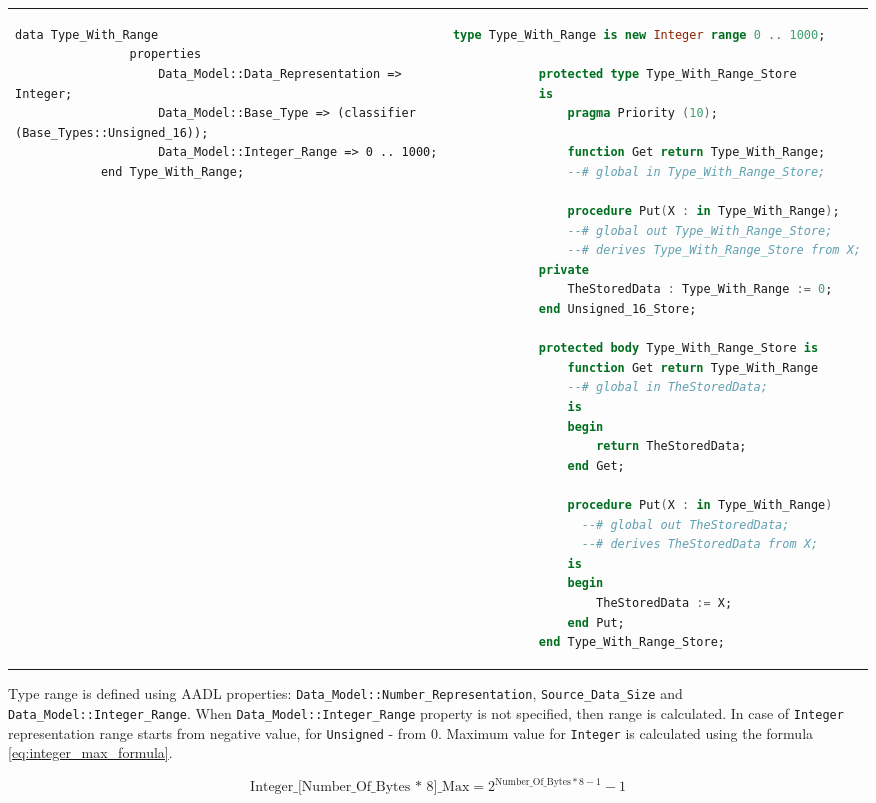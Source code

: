\begin{center}
\begin{longtable}{| p{2in} | p{4in} |}
		\\ \hline

		\begin{lstlisting}[language=aadl]
			data Type_With_Range
				properties
					Data_Model::Data_Representation => Integer;
					Data_Model::Base_Type => (classifier (Base_Types::Unsigned_16));
					Data_Model::Integer_Range => 0 .. 1000;
			end Type_With_Range;
		\end{lstlisting} 
		&
		\begin{lstlisting}[language=ada]
			type Type_With_Range is new Integer range 0 .. 1000;
    
		    protected type Type_With_Range_Store
		    is
		        pragma Priority (10);

		        function Get return Type_With_Range;
		        --# global in Type_With_Range_Store;

		        procedure Put(X : in Type_With_Range);
		        --# global out Type_With_Range_Store;
		        --# derives Type_With_Range_Store from X;
		    private
		        TheStoredData : Type_With_Range := 0;
		    end Unsigned_16_Store;

		    protected body Type_With_Range_Store is
		        function Get return Type_With_Range
		        --# global in TheStoredData;
		        is
		        begin
		            return TheStoredData;
		        end Get;

		        procedure Put(X : in Type_With_Range)
		          --# global out TheStoredData;
		          --# derives TheStoredData from X;
		        is
		        begin
		            TheStoredData := X;
		        end Put;
		    end Type_With_Range_Store;

		\end{lstlisting}
	\end{longtable}
\end{center}
\doublespacing

Type range is defined using AADL properties: \lstinline{Data_Model::Number_Representation}, \lstinline{Source_Data_Size} and \lstinline{Data_Model::Integer_Range}. When \lstinline{Data_Model::Integer_Range} property is not specified, then range is calculated. In case of \lstinline{Integer} representation range starts from negative value, for \lstinline{Unsigned} - from 0. Maximum value for \lstinline{Integer} is calculated using the formula \ref{eq:integer_max_formula}. 

\begin{equation} \label{eq:integer_max_formula}
	\text{Integer\_[Number\_Of\_Bytes * 8]\_Max} = 2^{\text{Number\_Of\_Bytes} * 8 - 1} - 1
\end{equation}

